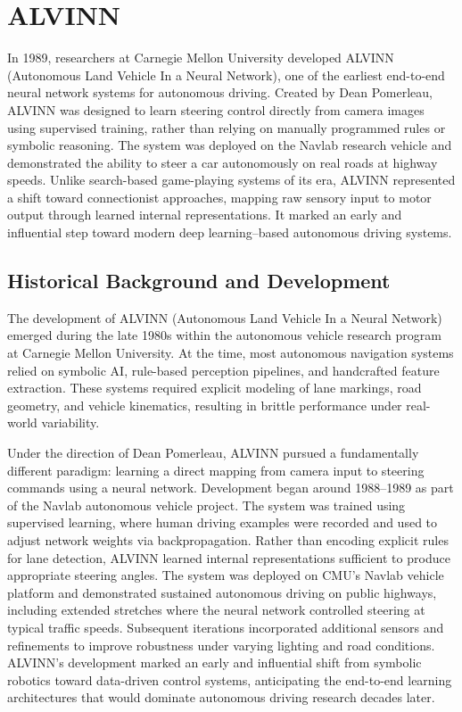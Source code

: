 \documentclass[11pt,a4paper]{report}
\begin{document}
\section{ALVINN}
In 1989, researchers at Carnegie Mellon University developed ALVINN (Autonomous Land Vehicle In a Neural Network),
one of the earliest end-to-end neural network systems for autonomous driving. Created by Dean Pomerleau, ALVINN was
designed to learn steering control directly from camera images using supervised training, rather than relying on manually
programmed rules or symbolic reasoning. The system was deployed on the Navlab research vehicle and demonstrated the
ability to steer a car autonomously on real roads at highway speeds. Unlike search-based game-playing systems of its era,
ALVINN represented a shift toward connectionist approaches, mapping raw sensory input to motor output through learned
internal representations. It marked an early and influential step toward modern deep learning–based autonomous driving systems.

\subsection{Historical Background and Development}
The development of ALVINN (Autonomous Land Vehicle In a Neural Network) emerged during the late 1980s within the autonomous
vehicle research program at Carnegie Mellon University. At the time, most autonomous navigation systems relied on symbolic AI,
rule-based perception pipelines, and handcrafted feature extraction. These systems required explicit modeling of lane markings,
road geometry, and vehicle kinematics, resulting in brittle performance under real-world variability.

Under the direction of Dean Pomerleau, ALVINN pursued a fundamentally different paradigm: learning a direct mapping from camera input
to steering commands using a neural network. Development began around 1988–1989 as part of the Navlab autonomous vehicle project. The system
was trained using supervised learning, where human driving examples were recorded and used to adjust network weights via backpropagation.
Rather than encoding explicit rules for lane detection, ALVINN learned internal representations sufficient to produce appropriate steering angles.
The system was deployed on CMU’s Navlab vehicle platform and demonstrated sustained autonomous driving on public highways, including extended stretches
where the neural network controlled steering at typical traffic speeds. Subsequent iterations incorporated additional sensors and refinements to improve
robustness under varying lighting and road conditions. ALVINN’s development marked an early and influential shift from symbolic robotics
toward data-driven control systems, anticipating the end-to-end learning architectures that would dominate autonomous driving research decades later.
\end{document}
